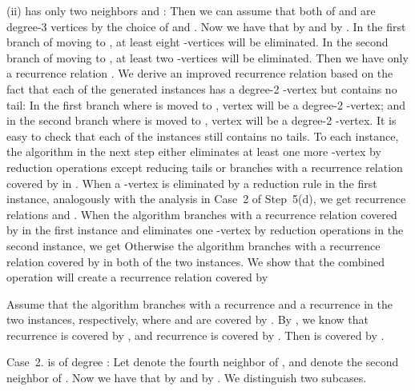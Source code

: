 \documentclass{elsart_TR2}
\begin{document}
(ii)     has only two neighbors  and :
Then  we can assume that  both of  and  are degree-3 vertices
by the choice of  and .
Now we have that   by  and  by .
In the first branch of moving  to , at least eight -vertices   will be eliminated.
In the second branch of moving  to ,  at least two -vertices   will be eliminated.
Then we have only a recurrence relation . We derive an improved recurrence relation
based on the fact that each of the generated instances has  a degree-2 -vertex
but contains no tail:
In the first branch where  is moved to ,  vertex
 will be a degree-2 -vertex; and  in the second branch where  is moved to ,
vertex  will be a degree-2 -vertex.
It is easy to check that each of the instances still contains no tails.
To each instance, the algorithm  in the next step
 either eliminates at least one more -vertex by reduction operations except reducing tails
or
branches with a recurrence relation covered by  in .
When a  -vertex is eliminated by a reduction rule in the first instance, analogously with the analysis in  Case~2 of Step~5(d),
 we get  recurrence relations
  and .
 When the algorithm branches with a recurrence relation covered by  in the first instance and eliminates one
 -vertex by reduction operations in the second instance, we get
Otherwise the algorithm branches with a recurrence relation covered by  in both of the two instances.
We show that the combined operation will create a recurrence relation covered by


Assume that the algorithm branches with
a recurrence  and
a recurrence  in the two instances, respectively,
where  and  are covered by .
By , we know that
recurrence  is covered by , and
recurrence
 is covered by .
Then  is covered by .




Case~2.  is of degree : Let  denote the fourth neighbor of ,
 and  denote the second neighbor of .
Now we have that  by  and 
by .
We distinguish two subcases.
\end{document}
